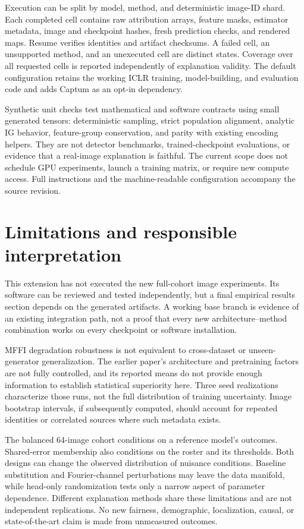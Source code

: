 \documentclass{article}
\begin{document}
Execution can be split by model, method, and deterministic image-ID shard. Each completed cell contains raw attribution arrays, feature masks, estimator metadata, image and checkpoint hashes, fresh prediction checks, and rendered maps. Resume verifies identities and artifact checksums. A failed cell, an unsupported method, and an unexecuted cell are distinct states. Coverage over all requested cells is reported independently of explanation validity. The default configuration retains the working ICLR training, model-building, and evaluation code and adds Captum as an opt-in dependency.

Synthetic unit checks test mathematical and software contracts using small generated tensors: deterministic sampling, strict population alignment, analytic IG behavior, feature-group conservation, and parity with existing encoding helpers. They are not detector benchmarks, trained-checkpoint evaluations, or evidence that a real-image explanation is faithful. The current scope does not schedule GPU experiments, launch a training matrix, or require new compute access. Full instructions and the machine-readable configuration accompany the source revision.

\section{Limitations and responsible interpretation}
This extension has not executed the new full-cohort image experiments. Its software can be reviewed and tested independently, but a final empirical results section depends on the generated artifacts. A working base branch is evidence of an existing integration path, not a proof that every new architecture--method combination works on every checkpoint or software installation.

MFFI degradation robustness is not equivalent to cross-dataset or unseen-generator generalization. The earlier paper's architecture and pretraining factors are not fully controlled, and its reported means do not provide enough information to establish statistical superiority here. Three seed realizations characterize those runs, not the full distribution of training uncertainty. Image bootstrap intervals, if subsequently computed, should account for repeated identities or correlated sources where such metadata exists.

The balanced 64-image cohort conditions on a reference model's outcomes. Shared-error membership also conditions on the roster and its thresholds. Both designs can change the observed distribution of nuisance conditions. Baseline substitution and Fourier-channel perturbations may leave the data manifold, while head-only randomization tests only a narrow aspect of parameter dependence. Different explanation methods share these limitations and are not independent replications. No new fairness, demographic, localization, causal, or state-of-the-art claim is made from unmeasured outcomes.
\end{document}
